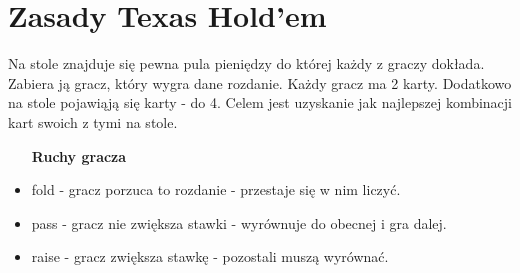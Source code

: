 \documentclass[11pt,wide]{mwart}
\begin{document}
\section{Zasady Texas Hold'em}
Na stole znajduje się pewna pula pieniędzy do której każdy z graczy dokłada. Zabiera ją gracz, który wygra dane rozdanie. Każdy gracz ma 2 karty. Dodatkowo na stole pojawiąją się karty - do 4. Celem jest uzyskanie jak najlepszej kombinacji kart swoich z tymi na stole.
\begin{itemize}
  \item [\textbf{Ruchy gracza}]
  \item fold - gracz porzuca to rozdanie - przestaje się w nim liczyć.
  \item pass - gracz nie zwiększa stawki - wyrównuje do obecnej i gra dalej.
  \item raise - gracz zwiększa stawkę - pozostali muszą wyrównać.
\end{itemize}
\end{document}
